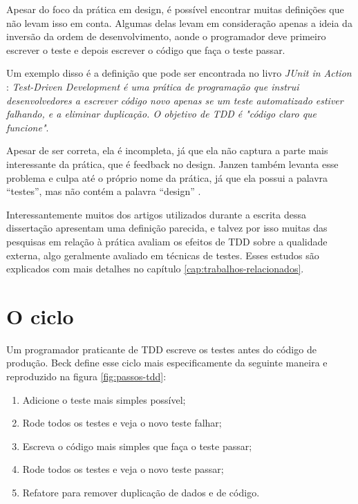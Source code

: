 Apesar do foco da prática em design, é possível encontrar muitas definições que
não levam isso em conta. Algumas delas levam em consideração apenas a ideia da
inversão da ordem de desenvolvimento, aonde o programador deve primeiro escrever
o teste e depois escrever o código que faça o teste passar.

Um exemplo disso é a definição que pode ser encontrada no livro \textit{JUnit
in Action} \cite{junit-in-action}: \textit{Test-Driven Development é uma
prática de programação que instrui desenvolvedores a escrever código novo
apenas se um teste automatizado estiver falhando, e a eliminar duplicação. O
objetivo de TDD é "código claro que funcione"}.

Apesar de ser correta, ela é incompleta, já que ela não captura a parte mais
interessante da prática, que é feedback no design. Janzen também levanta esse
problema e culpa até o próprio nome da prática, já que ela possui a palavra
``testes'', mas não contém a palavra ``design'' \cite{tdd-really-improve}.

Interessantemente muitos dos artigos utilizados durante a escrita dessa
dissertação apresentam uma definição parecida, e talvez por isso muitas das 
pesquisas em relação à prática avaliam os efeitos de TDD sobre a qualidade 
externa, algo geralmente avaliado em técnicas de testes. Esses estudos são 
explicados com mais detalhes no capítulo \ref{cap:trabalhos-relacionados}.

\section{O ciclo}

Um programador praticante de TDD escreve os testes antes do código de produção.
Beck define esse ciclo mais especificamente da seguinte maneira
\cite{TDDByExample} e reproduzido na figura \ref{fig:passos-tdd}:

\begin{enumerate}
	\item Adicione o teste mais simples possível; 
	\item Rode todos os testes e veja o novo teste falhar; 
	\item Escreva o código mais simples que faça o teste passar; 
	\item Rode todos os testes e veja o novo teste passar; 
	\item Refatore para remover duplicação de dados e de código.
\end{enumerate}

